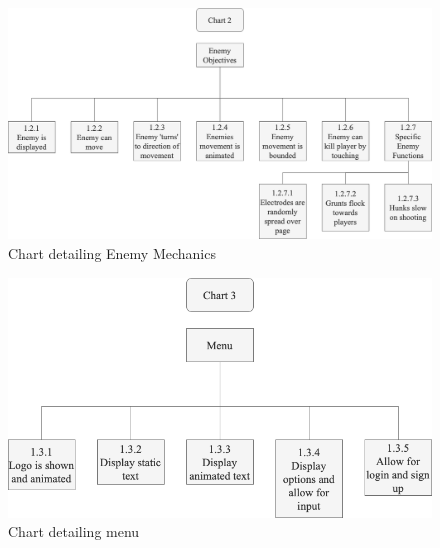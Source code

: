 \begin{figure}[H]
  \includegraphics[width=1\linewidth]{Figures/chart2.png}
  \centering
  \caption{Chart detailing Enemy Mechanics}
  \label{fig:Chart_2}
\end{figure}

\begin{figure}[H]
  \includegraphics[width=0.6\linewidth]{Figures/chart3.png}
  \centering
  \caption{Chart detailing menu}
  \label{fig:Chart_3}
\end{figure}

